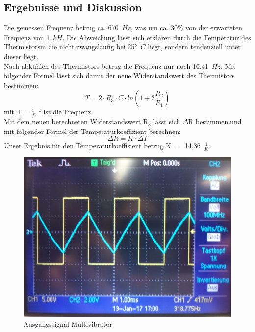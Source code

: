 \subsection{Ergebnisse und Diskussion}
Die gemessen Frequenz betrug ca. 670~$Hz$, was um ca. 30\% von der erwarteten Frequenz von 1~$kH$. Die Abweichung l\"asst sich erkl\"aren durch die Temperatur des Thermistorsm die nicht zwangsl\"aufig bei 25$°$~$C$ liegt, sondern tendenziell unter dieser liegt.
\\
Nach abk\"uhlen des Thermistors betrug die Frequenz nur noch 10,41~$Hz$. Mit folgender Formel l\"asst sich damit der neue Widerstandswert des Thermistors bestimmen: 
\begin{equation*}
T = 2\cdot R_3 \cdot C \cdot ln(1+ 2\frac{R_2}{R_1})
\end{equation*}
mit T = $\frac{1}{f}$, f ist die Frequenz. \\
Mit dem neuen berechneten Widerstandswert R$_3$ l\"asst sich $\Delta$R bestimmen.und mit folgender Formel der Temperaturkoeffizient berechnen:
\begin{equation*}
\Delta R = K \cdot \Delta T
\end{equation*}
Unser Ergebnis f\"ur den Temperaturkoeffizient betrug K $=$ 14,36~$\frac{1}{K}$ 
\begin{figure}[!h]
\begin{center}
\includegraphics[scale=0.6]{bild/AusgangMulti}
\caption{Ausgangssignal Multivibrator}
\end{center}
\end{figure}
